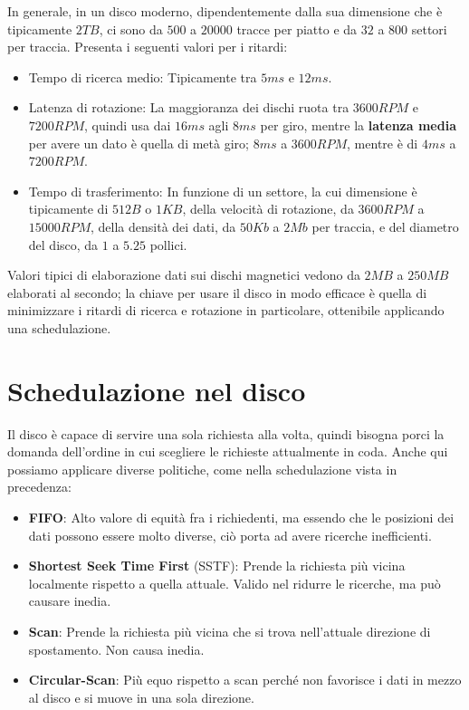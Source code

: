 \noindent In generale, in un disco moderno, dipendentemente dalla sua dimensione che è tipicamente $2TB$, ci sono da $500$ a $20000$ tracce per piatto
e da $32$ a $800$ settori per traccia. Presenta i seguenti valori per i ritardi: \begin{itemize}
    \item Tempo di ricerca medio: Tipicamente tra $5ms$ e $12ms$.
    \item Latenza di rotazione: La maggioranza dei dischi ruota tra $3600RPM$ e $7200RPM$, quindi usa dai $16ms$ agli $8ms$ per giro, mentre la \textbf{
    latenza media} per avere un dato è quella di metà giro; $8ms$ a $3600RPM$, mentre è di $4ms$ a $7200RPM$.
    \item Tempo di trasferimento: In funzione di un settore, la cui dimensione è tipicamente di $512B$ o $1KB$, della velocità di rotazione, da
    $3600RPM$ a $15000RPM$, della densità dei dati, da $50Kb$ a $2Mb$ per traccia, e del diametro del disco, da $1$ a $5.25$ pollici.
\end{itemize}

\noindent Valori tipici di elaborazione dati sui dischi magnetici vedono da $2MB$ a $250MB$ elaborati al secondo; la chiave per usare il disco in modo
efficace è quella di minimizzare i ritardi di ricerca e rotazione in particolare, ottenibile applicando una schedulazione.

%

\section{Schedulazione nel disco} %
Il disco è capace di servire una sola richiesta alla volta, quindi bisogna porci la domanda dell'ordine in cui scegliere le richieste attualmente in
coda. Anche qui possiamo applicare diverse politiche, come nella schedulazione vista in precedenza: \begin{itemize}
    \item \textbf{FIFO}: Alto valore di equità fra i richiedenti, ma essendo che le posizioni dei dati possono essere molto diverse, ciò porta ad avere
    ricerche inefficienti.
    \item \textbf{Shortest Seek Time First} (SSTF): Prende la richiesta più vicina localmente rispetto a quella attuale. Valido nel ridurre le ricerche,
    ma può causare inedia.
    \item \textbf{Scan}: Prende la richiesta più vicina che si trova nell'attuale direzione di spostamento. Non causa inedia.
    \item \textbf{Circular-Scan}: Più equo rispetto a scan perché non favorisce i dati in mezzo al disco e si muove in una sola direzione.
\end{itemize}

